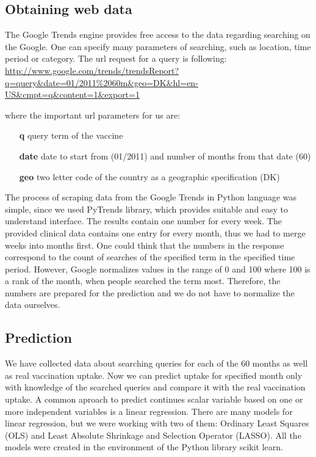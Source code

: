 \documentclass{sig-alternate}
\begin{document}
\subsection{Obtaining web data}
The Google Trends engine\cite{trends} provides free access to the data regarding searching on the Google.
One can specify many parameters of searching, such as location, time period or category.
The url request for a query is following:
\url{http://www.google.com/trends/trendsReport?q=query\&date=01/2011\%2060m\&geo=DK\&hl=en-US\&cmpt=q\&content=1\&export=1}

where the important url parameters for us are:
\begin{itemize}
  \item[\bf{q}] query term of the vaccine
  \item[\bf{date}] date to start from (01/2011) and number of months from that date (60)
  \item[\bf{geo}] two letter code of the country as a geographic specification (DK)  
\end{itemize}
The process of scraping data from the Google Trends in Python language was simple, since we used PyTrends library\cite{pytrends}, which provides suitable and easy to understand interface.
The results contain one number for every week.
The provided clinical data contains one entry for every month, thus we had to merge weeks into months first.
One could think that the numbers in the response correspond to the count of searches of the specified term in the specified time period.
However, Google normalizes values in the range of 0 and 100 where 100 is a rank of the month, when people searched the term most.
Therefore, the numbers are prepared for the prediction and we do not have to normalize the data ourselves.

\subsection{Prediction}
We have collected data about searching queries for each of the 60 months as well as real vaccination uptake.
Now we can predict uptake for specified month only with knowledge of the searched queries and compare it with the real vaccination uptake.
A common aproach to predict continues scalar variable based on one or more independent variables is a linear regression.
There are many models for linear regression, but we were working with two of them: Ordinary Least Squares (OLS) and Least Absolute Shrinkage and Selection Operator (LASSO).
All the models were created in the environment of the Python library scikit learn\cite{scikit}.
\end{document}
